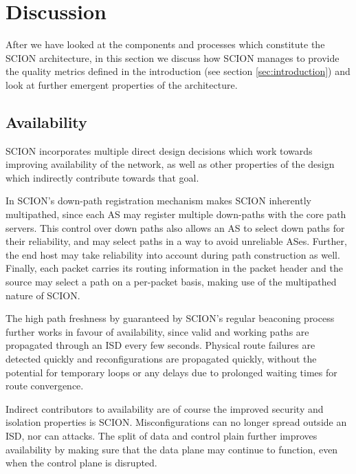\documentclass[../eva1_scion.tex]{subfiles}
\begin{document}
   \section{Discussion}\label{sec:discussion}

    After we have looked at the components and processes which constitute the SCION architecture, in this section we discuss how SCION manages to provide the quality metrics defined in the introduction (see section \ref{sec:introduction}) and look at further emergent properties of the architecture.

    \subsection{Availability}
    SCION incorporates multiple direct design decisions which work towards improving availability of the network, as well as other properties of the design which indirectly contribute towards that goal.

    In SCION's down-path registration mechanism makes SCION inherently multipathed, since each AS may register multiple down-paths with the core path servers. This control over down paths also allows an AS to select down paths for their reliability, and may select paths in a way to avoid unreliable ASes. Further,  the end host may take reliability into account during path construction as well. Finally, each packet carries its routing information in the packet header and the source may select a path on a per-packet basis, making use of the multipathed nature of SCION.

    The high path freshness by guaranteed by SCION's regular beaconing process further works in favour of availability, since valid and working paths are propagated through an ISD every few seconds. Physical route failures are detected quickly and reconfigurations are propagated quickly, without the potential for temporary loops or any delays due to prolonged waiting times for route convergence.

    Indirect contributors to availability are of course the improved security and isolation properties is SCION. Misconfigurations can no longer spread outside an ISD, nor can attacks. The split of data and control plain further improves availability by making sure that the data plane may continue to function, even when the control plane is disrupted.
\end{document}

